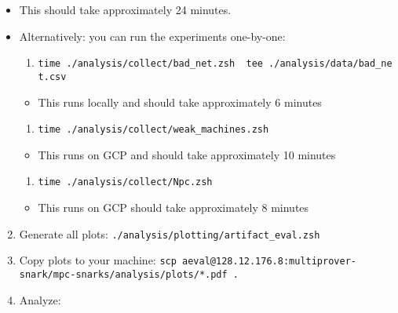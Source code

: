 \documentclass[letterpaper,twocolumn,10pt]{article}
\providecommand{\tightlist}{%
  \setlength{\itemsep}{0pt}\setlength{\parskip}{0pt}}
\begin{document}
{\begin{itemize}
\tightlist
\item
  This should take approximately 24 minutes.
\item
  Alternatively: you can run the experiments one-by-one:

  \begin{enumerate}
  \def\labelenumi{\arabic{enumi}.}
  \tightlist
  \item
    \texttt{time\ ./analysis/collect/bad\_net.zsh\ \textbar{}\ tee\ ./analysis/data/bad\_net.csv}
  \end{enumerate}

  \begin{itemize}
  \tightlist
  \item
    This runs locally and should take approximately 6 minutes
  \end{itemize}

  \begin{enumerate}
  \def\labelenumi{\arabic{enumi}.}
  \setcounter{enumi}{1}
  \tightlist
  \item
    \texttt{time\ ./analysis/collect/weak\_machines.zsh}
  \end{enumerate}

  \begin{itemize}
  \tightlist
  \item
    This runs on GCP and should take approximately 10 minutes
  \end{itemize}

  \begin{enumerate}
  \def\labelenumi{\arabic{enumi}.}
  \setcounter{enumi}{2}
  \tightlist
  \item
    \texttt{time\ ./analysis/collect/Npc.zsh}
  \end{enumerate}

  \begin{itemize}
  \tightlist
  \item
    This runs on GCP should take approximately 8 minutes
  \end{itemize}
\end{itemize}
\begin{enumerate}
  \setcounter{enumi}{1}
\def\labelenumi{\arabic{enumi}.}
\tightlist
\item
  Generate all plots: \texttt{./analysis/plotting/artifact\_eval.zsh}
\item
  Copy plots to your machine:
  \texttt{scp\ \textquotesingle{}aeval@128.12.176.8:multiprover-snark/mpc-snarks/analysis/plots/*.pdf\textquotesingle{}\ .}
\item
  Analyze:


\end{enumerate}}
\end{document}
